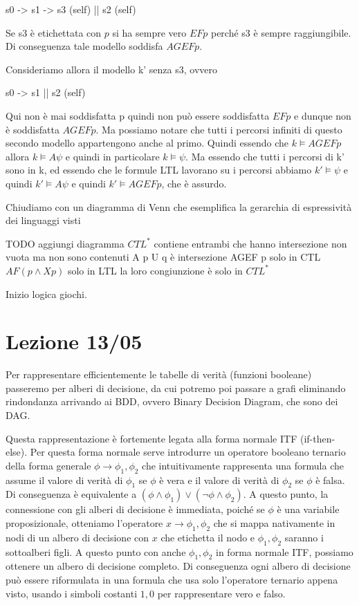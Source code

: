 s0 -> s1 -> s3 (self)
      ||
      s2 (self)

Se s3 è etichettata con \(p\) si ha sempre vero \(EFp\) perché s3 è sempre raggiungibile. Di conseguenza tale modello soddisfa \(AG EFp\).

Consideriamo allora il modello k' senza s3, ovvero

s0 -> s1
      ||
      s2 (self)

Qui non è mai soddisfatta p quindi non può essere soddisfatta \(EFp\) e dunque non è soddisfatta \(AG EFp\).
Ma possiamo notare che tutti i percorsi infiniti di questo secondo modello appartengono anche al primo.
Quindi essendo che \(k\models AGEFp\) allora \(k \models A\psi\) e quindi in particolare \(k\models \psi\). Ma essendo che tutti i percorsi di k' sono in k, ed essendo che le formule LTL lavorano su i percorsi abbiamo \(k' \models \psi\) e quindi \(k' \models A\psi\) e quindi \(k' \models AGEFp\), che è assurdo.

Chiudiamo con un diagramma di Venn che esemplifica la gerarchia di espressività dei linguaggi visti

TODO aggiungi diagramma 
\(CTL^*\) contiene entrambi che hanno intersezione non vuota ma non sono contenuti
A p U q è intersezione
AGEF p solo in CTL
\(AF(p \land Xp)\) solo in LTL
la loro congiunzione è solo in \(CTL^*\)

Inizio logica giochi.

\chapter{Lezione 13/05}

Per rappresentare efficientemente le tabelle di verità (funzioni booleane) passeremo per alberi di decisione, da cui potremo poi passare a grafi eliminando rindondanza arrivando ai BDD, ovvero Binary Decision Diagram, che sono dei DAG\@.

Questa rappresentazione è fortemente legata alla forma normale ITF (if-then-else). Per questa forma normale serve introdurre un operatore booleano ternario della forma generale \(\phi \to \phi_1,\phi_2\) che intuitivamente rappresenta una formula che assume il valore di verità di \(\phi_1\) se \(\phi\) è vera e il valore di verità di \(\phi_2\) se \(\phi\) è falsa. Di conseguenza è equivalente a \((\phi \land \phi_1) \lor (\neg \phi \land \phi_2)\). A questo punto, la connessione con gli alberi di decisione è immediata, poiché se \(\phi\) è una variabile proposizionale, otteniamo l'operatore \(x\to \phi_1,\phi_2\) che si mappa nativamente in nodi di un albero di decisione con \(x\) che etichetta il nodo e \(\phi_1,\phi_2\) saranno i sottoalberi figli. A questo punto con anche \(\phi_1,\phi_2\) in forma normale ITF, possiamo ottenere un albero di decisione completo. Di conseguenza ogni albero di decisione può essere riformulata in una formula che usa solo l'operatore ternario appena visto, usando i simboli costanti \(1,0\) per rappresentare vero e falso.

